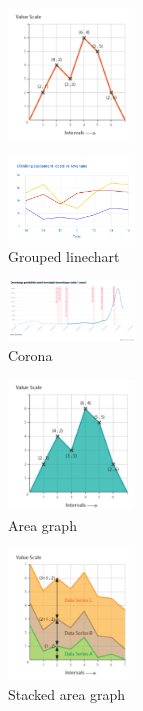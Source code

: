 \documentclass{article}
\begin{document}
\begin{figure}[H]
    \centering
    \includegraphics[width=0.3\textwidth]{dv-linechart1.png}
    \caption{}
\end{figure}
\begin{figure}[H]
    \centering
    \includegraphics[width=0.3\textwidth]{dv-linechart2.png}
    \caption{Grouped linechart}
\end{figure}
\begin{figure}[H]
    \centering
    \includegraphics[width=0.3\textwidth]{dv-linechart3.png}
    \caption{Corona}
\end{figure}
\begin{figure}[H]
    \centering
    \includegraphics[width=0.3\textwidth]{dv-linechart4.png}
    \caption{Area graph}
\end{figure}
\begin{figure}[H]
    \centering
    \includegraphics[width=0.3\textwidth]{dv-linechart5.png}
    \caption{Stacked area graph}
\end{figure}
\end{document}
